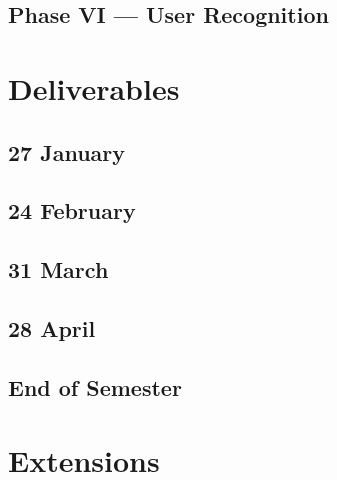 \documentclass{scrartcl}
\begin{document}
    \subsection{Phase VI --- User Recognition}
  \section{Deliverables}
    \subsection{27 January}
    \subsection{24 February}
    \subsection{31 March}
    \subsection{28 April}
    \subsection{End of Semester}
  \section{Extensions}
\end{document}
